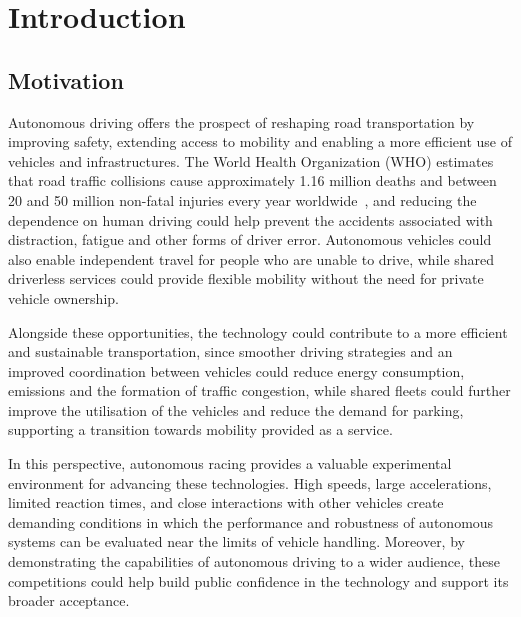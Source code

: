 \chapter{Introduction}
\label{ch:intro}

\section{Motivation}
\label{sec:intro_motivation}

Autonomous driving offers the prospect of reshaping road transportation by improving safety, extending access to mobility and enabling a more efficient use of vehicles and infrastructures. The World Health Organization (WHO) estimates that road traffic collisions cause approximately 1.16 million deaths and between 20 and 50 million non-fatal injuries every year worldwide~\cite{who2026}, and reducing the dependence on human driving could help prevent the accidents associated with distraction, fatigue and other forms of driver error. Autonomous vehicles could also enable independent travel for people who are unable to drive, while shared driverless services could provide flexible mobility without the need for private vehicle ownership.

Alongside these opportunities, the technology could contribute to a more efficient and sustainable transportation, since smoother driving strategies and an improved coordination between vehicles could reduce energy consumption, emissions and the formation of traffic congestion, while shared fleets could further improve the utilisation of the vehicles and reduce the demand for parking, supporting a transition towards mobility provided as a service.

In this perspective, autonomous racing provides a valuable experimental environment for advancing these technologies. High speeds, large accelerations, limited reaction times, and close interactions with other vehicles create demanding conditions in which the performance and robustness of autonomous systems can be evaluated near the limits of vehicle handling. Moreover, by demonstrating the capabilities of autonomous driving to a wider audience, these competitions could help build public confidence in the technology and support its broader acceptance.

